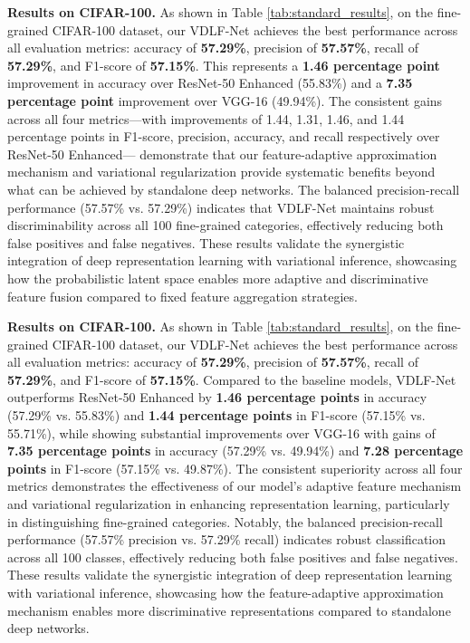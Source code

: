 \textbf{Results on CIFAR-100.} As shown in Table \ref{tab:standard_results}, 
on the fine-grained CIFAR-100 dataset, our VDLF-Net achieves the best performance 
across all evaluation metrics: accuracy of \textbf{57.29\%}, precision of \textbf{57.57\%}, 
recall of \textbf{57.29\%}, and F1-score of \textbf{57.15\%}. This represents a 
\textbf{1.46 percentage point} improvement in accuracy over ResNet-50 Enhanced (55.83\%) 
and a \textbf{7.35 percentage point} improvement over VGG-16 (49.94\%). The consistent 
gains across all four metrics—with improvements of 1.44, 1.31, 1.46, and 1.44 percentage 
points in F1-score, precision, accuracy, and recall respectively over ResNet-50 Enhanced— 
demonstrate that our feature-adaptive approximation mechanism and variational regularization 
provide systematic benefits beyond what can be achieved by standalone deep networks. 
The balanced precision-recall performance (57.57\% vs. 57.29\%) indicates that VDLF-Net 
maintains robust discriminability across all 100 fine-grained categories, effectively 
reducing both false positives and false negatives. These results validate the synergistic 
integration of deep representation learning with variational inference, showcasing how 
the probabilistic latent space enables more adaptive and discriminative feature fusion 
compared to fixed feature aggregation strategies.

\textbf{Results on CIFAR-100.} As shown in Table \ref{tab:standard_results}, 
on the fine-grained CIFAR-100 dataset, our VDLF-Net achieves the best performance 
across all evaluation metrics: accuracy of \textbf{57.29\%}, precision of \textbf{57.57\%}, 
recall of \textbf{57.29\%}, and F1-score of \textbf{57.15\%}. Compared to the baseline models, 
VDLF-Net outperforms ResNet-50 Enhanced by \textbf{1.46 percentage points} in accuracy 
(57.29\% vs. 55.83\%) and \textbf{1.44 percentage points} in F1-score (57.15\% vs. 55.71\%), 
while showing substantial improvements over VGG-16 with gains of \textbf{7.35 percentage points} 
in accuracy (57.29\% vs. 49.94\%) and \textbf{7.28 percentage points} in F1-score 
(57.15\% vs. 49.87\%). The consistent superiority across all four metrics demonstrates 
the effectiveness of our model's adaptive feature mechanism and variational regularization 
in enhancing representation learning, particularly in distinguishing fine-grained categories. 
Notably, the balanced precision-recall performance (57.57\% precision vs. 57.29\% recall) 
indicates robust classification across all 100 classes, effectively reducing both false 
positives and false negatives. These results validate the synergistic integration of deep 
representation learning with variational inference, showcasing how the feature-adaptive 
approximation mechanism enables more discriminative representations compared to standalone 
deep networks.

